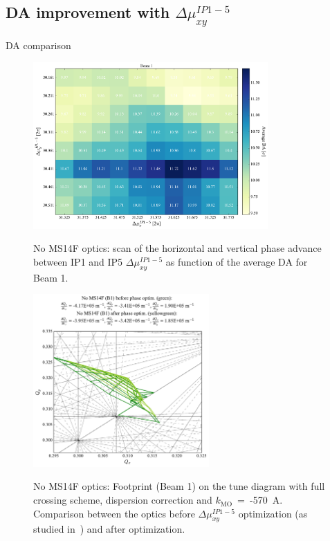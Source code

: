 \documentclass{cernatsnote}
\begin{document}
\subsection{DA improvement with $\Delta\mu_{xy}^{IP1-5}$}

DA comparison

\begin{figure}[h!]
\centering
\includegraphics[width=0.8\textwidth]{images/scan_noms14falt_avg_b1.pdf} \\
\caption{\label{da_scan_ms14f} No MS14F optics: scan of the horizontal and vertical phase advance between IP1 and IP5 $\Delta\mu_{xy}^{IP1-5}$ as function of the average DA for Beam 1. }
\end{figure}

\begin{figure}[h!]
\centering
\includegraphics[width=0.6\textwidth]{images/footprint_b1_noms14falt_optim.pdf} \\
\caption{\label{da_scan_ms14f} No MS14F optics: Footprint (Beam 1) on the tune diagram with full crossing scheme, dispersion correction and $k_{\mathrm{MO}}$~=~-570~A. Comparison between the optics before $\Delta\mu_{xy}^{IP1-5}$ optimization (as studied in~\cite{ms10_ppt1}) and after optimization. }
\end{figure}
\end{document}
